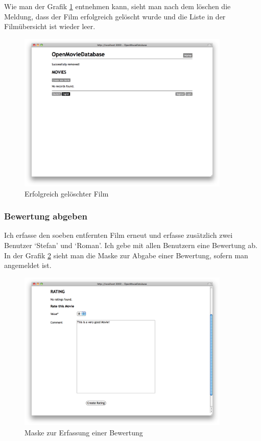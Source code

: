 Wie man der Grafik \ref{test_movie_06} entnehmen kann, sieht man nach dem löschen
die Meldung, dass der Film erfolgreich gelöscht wurde und die Liste in der
Filmübersicht ist wieder leer.

\begin{figure}[ht]
    \begin{center}
        \includegraphics[width=0.9\textwidth,angle=0]{./bilder/tests/test_movie_06.png}
        \caption{Erfolgreich gelöschter Film}
        \label{test_movie_06}
    \end{center}
\end{figure}

\clearpage

\subsubsection{Bewertung abgeben}
Ich erfasse den soeben entfernten Film erneut und erfasse zusätzlich zwei Benutzer
`Stefan' und `Roman'. Ich gebe mit allen Benutzern eine Bewertung ab. In der Grafik
\ref{test_bewertung_01} sieht man die Maske zur Abgabe einer Bewertung, sofern man
angemeldet ist.

\begin{figure}[ht]
    \begin{center}
        \includegraphics[width=0.9\textwidth,angle=0]{./bilder/tests/test_bewertung_01.png}
        \caption{Maske zur Erfassung einer Bewertung}
        \label{test_bewertung_01}
    \end{center}
\end{figure}

